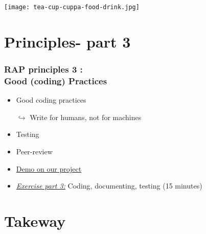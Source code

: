 \documentclass[xcolor=x11names,compress]{beamer}
\renewcommand{\(}{\begin{columns}}
\renewcommand{\)}{\end{columns}}
\newcommand{\<}[1]{\begin{column}{#1}}
\renewcommand{\>}{\end{column}}
\begin{document}
\begin{frame}
\begin{center}
\Large{ \color{brique}{Tea Break}}
\vspace{0.5cm}

\texttt{[image: tea-cup-cuppa-food-drink.jpg]}
\end{center}
\end{frame}


\section{Principles- part 3}

\begin{frame}[<+->]
   \frametitle{RAP principles 3 :  \\Good (coding) Practices}
   \pause
    \begin{itemize}[<+->]
     \item Good coding practices
     \item[$\hookrightarrow$] Write for humans, not for machines
     \item Testing
     \item Peer-review
     \item \href{https://sergegoussev.github.io/ESCAP_RAP_class/docs/teaching_materials/sept_18/sept_18_session.html\#practical-set-three}{Demo on our project}
     \item \href{https://sergegoussev.github.io/ESCAP_RAP_class/docs/teaching_materials/sept_18/sept_18_session.html\#exercise-3}{\emph{Exercise part 3:}}  Coding, documenting, testing (15 minutes)
    \end{itemize}
\end{frame}


\section{Takeway}
\end{document}
